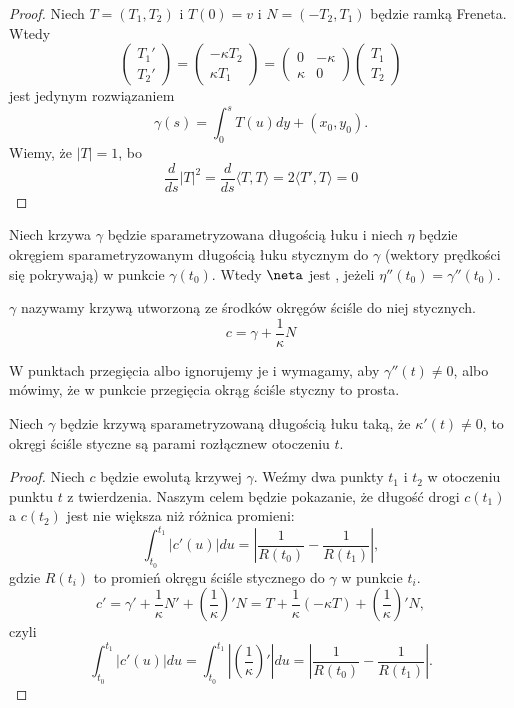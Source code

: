\begin{proof}
  Niech $T=(T_1, T_2)$ i $T(0)=v$ i $N=(-T_2, T_1)$ będzie ramką Freneta. Wtedy
  $$\begin{pmatrix}T_1'\\T_2'\end{pmatrix}=\begin{pmatrix}-\kappa T_2\\\kappa T_1\end{pmatrix}=\begin{pmatrix}0 & -\kappa\\ \kappa & 0 \end{pmatrix}\begin{pmatrix}T_1\\T_2\end{pmatrix}$$
  jest jedynym rozwiązaniem 
  $$\gamma(s)=\int_0^sT(u)dy+(x_0, y_0).$$
  Wiemy, że $|T|=1$, bo 
  $$\frac{d}{ds}|T|^2=\frac{d}{ds}\langle T,T\rangle=2\langle T',T\rangle=0$$
\end{proof}

\begin{definition}{}{}
  Niech krzywa $\gamma$ będzie sparametryzowana długością łuku i niech $\eta$ będzie okręgiem sparametryzowanym długością łuku stycznym do $\gamma$ (wektory prędkości się pokrywają) w punkcie $\gamma(t_0)$. Wtedy $\neta$ jest , jeżeli $\eta''(t_0)=\gamma''(t_0)$.
\end{definition}

\begin{definition}{}{}
   $\gamma$ nazywamy krzywą utworzoną ze środków okręgów ściśle do niej stycznych.
  $$c=\gamma+\frac{1}{\kappa}N$$
\end{definition}

W punktach przegięcia albo ignorujemy je i wymagamy, aby $\gamma''(t)\neq0$, albo mówimy, że w punkcie przegięcia okrąg ściśle styczny to prosta.

\begin{fact}{}{}
  Niech $\gamma$ będzie krzywą sparametryzowaną długością łuku taką, że $\kappa'(t)\neq 0$, to okręgi ściśle styczne są parami rozłącznew otoczeniu $t$.
\end{fact}

\begin{proof}
  Niech $c$ będzie ewolutą krzywej $\gamma$. Weźmy dwa punkty $t_1$ i $t_2$ w otoczeniu punktu $t$ z twierdzenia. Naszym celem będzie pokazanie, że długość drogi $c(t_1)$ a $c(t_2)$ jest nie większa niż różnica promieni:
  $$\int_{t_0}^{t_1}|c'(u)|du=\left|\frac{1}{R(t_0)}-\frac{1}{R(t_1)}\right|,$$
  gdzie $R(t_i)$ to promień okręgu ściśle stycznego do $\gamma$ w punkcie $t_i$.
  $$c'=\gamma'+\frac{1}{\kappa}N'+\left(\frac{1}{\kappa}\right)'N=T+\frac{1}{\kappa}(-\kappa T)+\left(\frac{1}{\kappa}\right)'N,$$
  czyli
  $$\int_{t_0}^{t_1}|c'(u)|du=\int_{t_0}^{t_1}\left|\left(\frac{1}{\kappa}\right)'\right| du=\left|\frac{1}{R(t_0)}-\frac{1}{R(t_1)}\right|.$$
\end{proof}



